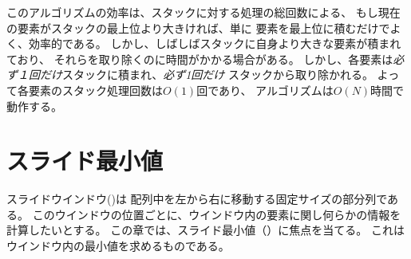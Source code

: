 \begin{comment}
The efficiency of the algorithm depends on
the total number of stack operations.
If the current element is larger than
the top element in the stack, it is directly
added to the stack, which is efficient.
However, sometimes the stack can contain several
larger elements and it takes time to remove them.
Still, each element is added \emph{exactly once} to the stack
and removed \emph{at most once} from the stack.
Thus, each element causes $O(1)$ stack operations,
and the algorithm works in $O(n)$ time.
\end{comment}

このアルゴリズムの効率は、スタックに対する処理の総回数による、
もし現在の要素がスタックの最上位より大きければ、単に
要素を最上位に積むだけでよく、効率的である。
しかし、しばしばスタックに自身より大きな要素が積まれており、
それらを取り除くのに時間がかかる場合がある。
しかし、各要素は\emph{必ず１回だけ}スタックに積まれ、\emph{必ず1回だけ}
スタックから取り除かれる。
よって各要素のスタック処理回数は$O(1)$回であり、
アルゴリズムは$O(N)$時間で動作する。

\begin{comment}
\section{Sliding window minimum}

\index{sliding window}
\index{sliding window minimum}

A \key{sliding window} is a constant-size subarray
that moves from left to right through the array.
At each window position,
we want to calculate some information
about the elements inside the window.
In this section, we focus on the problem
of maintaining the \key{sliding window minimum},
which means that
we should report the smallest value inside each window.
\end{comment}

\section{スライド最小値}


スライドウインドウ()は
配列中を左から右に移動する固定サイズの部分列である。
このウインドウの位置ごとに、ウインドウ内の要素に関し何らかの情報を計算したいとする。
この章では、スライド最小値（）に焦点を当てる。
これはウインドウ内の最小値を求めるものである。

